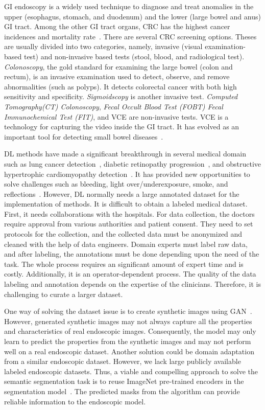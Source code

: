 \documentclass[journal]{IEEEtran}
\begin{document}
\ac{GI} endoscopy is a widely used technique to diagnose and treat anomalies in the upper (esophagus, stomach, and duodenum) and the lower (large bowel and anus) GI tract. Among the other \ac{GI} tract organs, \ac{CRC} has the highest cancer incidences and mortality rate~\cite{sung2021global}. There are several \ac{CRC} screening options. Theses are usually divided into two categories, namely, invasive (visual examination-based test) and non-invasive based tests (stool, blood, and radiological test). \emph{Colonoscopy}, the gold standard for examining the large bowel (colon and rectum), is an invasive examination used to detect, observe, and remove abnormalities (such as polyps). It detects colorectal cancer with both high sensitivity and specificity. \emph{Sigmoidscopy} is another invasive test. \emph{Computed Tomography(CT) Colonoscopy}, \emph{Fecal Occult Blood Test (FOBT) Fecal Immunochemical Test (FIT)}, and \ac{VCE} are non-invasive tests. \ac{VCE} is a technology for capturing the video inside the \ac{GI} tract.  It has evolved as an important tool for detecting small bowel diseases~\cite{kornbluth2004video}. 



\ac{DL} methods have made a significant breakthrough in several medical domain such as lung cancer detection~\cite{ardila2019end}, diabetic retinopathy progression~\cite{arcadu2019deep}, and obstructive hypertrophic cardiomyopathy detection~\cite{green2019machine}. It has provided new opportunities to solve challenges such as bleeding, light over/underexposure, smoke, and reflections~\cite{bodenstedt2018comparative}. However, \ac{DL} normally needs a large annotated dataset for the implementation of methods. It is difficult to obtain a labeled medical dataset. First, it needs collaborations with the hospitals.  For data collection, the doctors require approval from various authorities and patient consent. They need to set protocols for the collection, and the collected data must be anonymized and cleaned with the help of data engineers.  Domain experts must label raw data, and after labeling, the annotations must be done depending upon the need of the task. The whole process requires an significant amount of expert time and is costly. Additionally, it is an operator-dependent process. The quality of the data labeling and annotation depends on the expertise of the clinicians. Therefore, it is challenging to curate a larger dataset.

One way of solving the dataset issue is to create synthetic images using \ac{GAN}~\cite{goodfellow2014generative}. However, generated synthetic images may not always capture all the properties and characteristics of real endoscopic images. Consequently, the model may only learn to predict the properties from the synthetic images and may not perform well on a real endoscopic dataset. Another solution could be domain adaptation from a similar endoscopic dataset. However, we lack large publicly available labeled endoscopic datasets. Thus, a viable and compelling approach to solve the semantic segmentation task is to reuse ImageNet pre-trained encoders in the segmentation model~\cite{chen2017deeplab}. The predicted masks from the algorithm can provide reliable information to the endoscopic model. 
\end{document}
